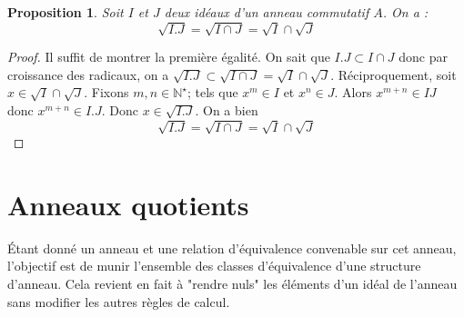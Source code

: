 \documentclass[french]{book}
\newcommand{\N}{\mathbb{N}}
\newcommand{\st}{^\star}
\theoremstyle{plain}
\newtheorem{prop}{Proposition}[chapter]
\theoremstyle{definition}
\theoremstyle{remark}
\begin{document}
\begin{prop}
	Soit $I$ et $J$ deux idéaux d'un anneau commutatif $A$. On a : $$\sqrt{I.J}=\sqrt{I\cap J}=\sqrt{I}\cap\sqrt{J}$$
\end{prop}
\begin{proof}
	Il suffit de montrer la première égalité. On sait que $I.J\subset I\cap J$ donc par croissance des radicaux, on a $\sqrt{I.J}\subset\sqrt{I\cap J}=\sqrt{I}\cap\sqrt{J}$. Réciproquement, soit $x\in\sqrt{I}\cap\sqrt{J}$. Fixons $m,n\in\N\st$; tels que $x^m\in I$ et $x^n\in J$. Alors $x^{m+n}\in IJ$ donc $x^{m+n}\in I.J$. Donc $x\in\sqrt{I.J}$. On a bien $$\sqrt{I.J}=\sqrt{I\cap J}=\sqrt{I}\cap\sqrt{J}$$
\end{proof}
\section{Anneaux quotients}
Étant donné un anneau et une relation d'équivalence convenable sur cet anneau, l'objectif est de munir l'ensemble des classes d'équivalence d'une structure d'anneau. Cela revient en fait à "rendre nuls" les éléments d'un idéal de l'anneau sans modifier les autres règles de calcul.
\end{document}
